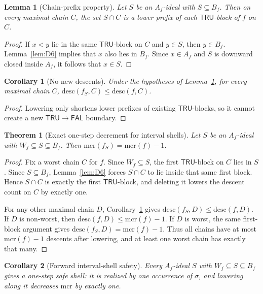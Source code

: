 \documentclass[11pt]{article}
\newtheorem{theorem}{Theorem}
\newtheorem{lemma}{Lemma}
\newtheorem{corollary}{Corollary}
\theoremstyle{remark}
\newcommand{\FAL}{\ensuremath{\mathsf{FAL}}}
\newcommand{\TRU}{\ensuremath{\mathsf{TRU}}}
\newcommand{\mcr}{\ensuremath{\mathrm{mcr}}}
\newcommand{\desc}{\mathrm{desc}}
\begin{document}
\begin{lemma}[Chain-prefix property]\label{lem:D7}
Let $S$ be an $A_f$-ideal with $S\subseteq B_f$. Then on every maximal
chain $C$, the set $S\cap C$ is a lower prefix of each $\TRU$-block of $f$
on $C$.
\end{lemma}

\begin{proof}
If $x<y$ lie in the same $\TRU$-block on $C$ and $y\in S$, then $y\in B_f$.
Lemma~\ref{lem:D6} implies that $x$ also lies in $B_f$. Since $x\in A_f$
and $S$ is downward closed inside $A_f$, it follows that $x\in S$.
\end{proof}

\begin{corollary}[No new descents]\label{cor:D8}
Under the hypotheses of Lemma~\ref{lem:D7}, for every maximal chain $C$,
$\desc(f_S,C)\le\desc(f,C)$.
\end{corollary}

\begin{proof}
Lowering only shortens lower prefixes of existing $\TRU$-blocks, so it
cannot create a new $\TRU\to\FAL$ boundary.
\end{proof}

\begin{theorem}[Exact one-step decrement for interval shells]
\label{thm:decrement}
Let $S$ be an $A_f$-ideal with $W_f\subseteq S\subseteq B_f$. Then
$\mcr(f_S)=\mcr(f)-1$.
\end{theorem}

\begin{proof}
Fix a worst chain $C$ for $f$. Since $W_f\subseteq S$, the first
$\TRU$-block on $C$ lies in $S$. Since $S\subseteq B_f$,
Lemma~\ref{lem:D6} forces $S\cap C$ to lie inside that same first block.
Hence $S\cap C$ is exactly the first $\TRU$-block, and deleting it lowers
the descent count on $C$ by exactly one.

For any other maximal chain $D$, Corollary~\ref{cor:D8} gives
$\desc(f_S,D)\le\desc(f,D)$. If $D$ is non-worst, then
$\desc(f,D)\le\mcr(f)-1$. If $D$ is worst, the same first-block argument
gives $\desc(f_S,D)=\mcr(f)-1$. Thus all chains have at most $\mcr(f)-1$
descents after lowering, and at least one worst chain has exactly that
many.
\end{proof}

\begin{corollary}[Forward interval-shell safety]\label{cor:D10}
Every $A_f$-ideal $S$ with $W_f\subseteq S\subseteq B_f$ gives a one-step
safe shell: it is realized by one occurrence of $\sigma$, and lowering
along it decreases $\mcr$ by exactly one.
\end{corollary}
\end{document}
